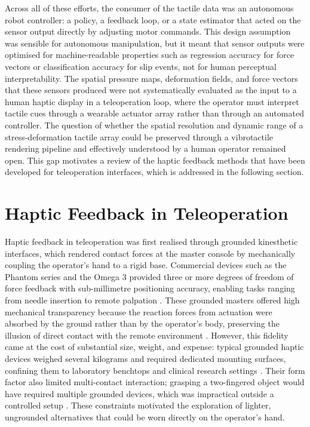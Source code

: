 \documentclass[12pt, a4paper]{report}
\begin{document}
Across all of these efforts, the consumer of the tactile data was an autonomous robot controller: a policy, a feedback loop, or a state estimator that acted on the sensor output directly by adjusting motor commands. This design assumption was sensible for autonomous manipulation, but it meant that sensor outputs were optimised for machine-readable properties such as regression accuracy for force vectors or classification accuracy for slip events, not for human perceptual interpretability. The spatial pressure maps, deformation fields, and force vectors that these sensors produced were not systematically evaluated as the input to a human haptic display in a teleoperation loop, where the operator must interpret tactile cues through a wearable actuator array rather than through an automated controller. The question of whether the spatial resolution and dynamic range of a stress-deformation tactile array could be preserved through a vibrotactile rendering pipeline and effectively understood by a human operator remained open. This gap motivates a review of the haptic feedback methods that have been developed for teleoperation interfaces, which is addressed in the following section.

\section{Haptic Feedback in Teleoperation}
Haptic feedback in teleoperation was first realised through grounded kinesthetic interfaces, which rendered contact forces at the master console by mechanically coupling the operator's hand to a rigid base. Commercial devices such as the Phantom series and the Omega 3 provided three or more degrees of freedom of force feedback with sub-millimetre positioning accuracy, enabling tasks ranging from needle insertion to remote palpation \cite{pacchierotti2017}. These grounded masters offered high mechanical transparency because the reaction forces from actuation were absorbed by the ground rather than by the operator's body, preserving the illusion of direct contact with the remote environment \cite{pacchierotti2017}. However, this fidelity came at the cost of substantial size, weight, and expense: typical grounded haptic devices weighed several kilograms and required dedicated mounting surfaces, confining them to laboratory benchtops and clinical research settings \cite{pacchierotti2017}. Their form factor also limited multi-contact interaction; grasping a two-fingered object would have required multiple grounded devices, which was impractical outside a controlled setup \cite{pacchierotti2017}. These constraints motivated the exploration of lighter, ungrounded alternatives that could be worn directly on the operator's hand.
\end{document}

